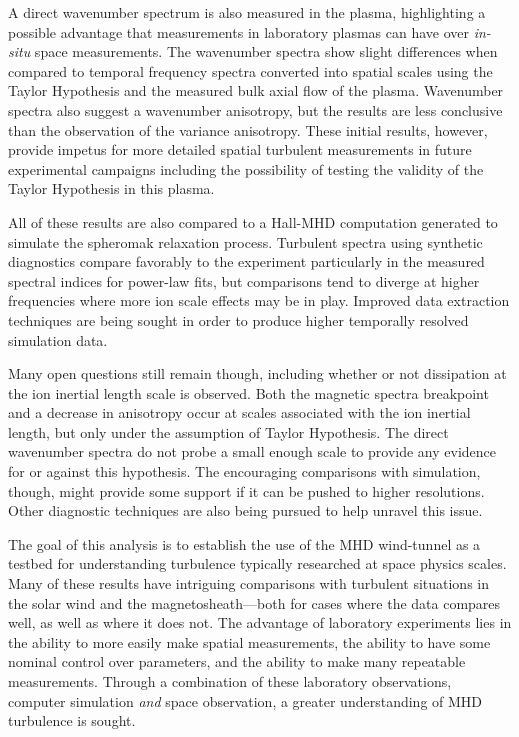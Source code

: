 \documentclass[preprint2]{aastex}
\begin{document}
A direct wavenumber spectrum is also measured in the plasma, highlighting a possible advantage that measurements in laboratory plasmas can have over {\it in-situ} space measurements. The wavenumber spectra show slight differences when compared to temporal frequency spectra converted into spatial scales using the Taylor Hypothesis and the measured bulk axial flow of the plasma. Wavenumber spectra also suggest a wavenumber anisotropy, but the results are less conclusive than the observation of the variance anisotropy. These initial results, however, provide impetus for more detailed spatial turbulent measurements in future experimental campaigns including the possibility of testing the validity of the Taylor Hypothesis in this plasma.

All of these results are also compared to a Hall-MHD computation generated to simulate the spheromak relaxation process. Turbulent spectra using synthetic diagnostics compare favorably to the experiment particularly in the measured spectral indices for power-law fits, but comparisons tend to diverge at higher frequencies where more ion scale effects may be in play. Improved data extraction techniques are being sought in order to produce higher temporally resolved simulation data.

Many open questions still remain though, including whether or not dissipation at the ion inertial length scale is observed. Both the magnetic spectra breakpoint and a decrease in anisotropy occur at scales associated with the ion inertial length, but only under the assumption of Taylor Hypothesis. The direct wavenumber spectra do not probe a small enough scale to provide any evidence for or against this hypothesis. The encouraging comparisons with simulation, though, might provide some support if it can be pushed to higher resolutions. Other diagnostic techniques are also being pursued to help unravel this issue.

The goal of this analysis is to establish the use of the MHD wind-tunnel as a testbed for understanding turbulence typically researched at space physics scales. Many of these results have intriguing comparisons with turbulent situations in the solar wind and the magnetosheath---both for cases where the data compares well, as well as where it does not. The advantage of laboratory experiments lies in the ability to more easily make spatial measurements, the ability to have some nominal control over parameters, and the ability to make many repeatable measurements. Through a combination of these laboratory observations, computer simulation {\it and} space observation, a greater understanding of MHD turbulence is sought.
\end{document}
